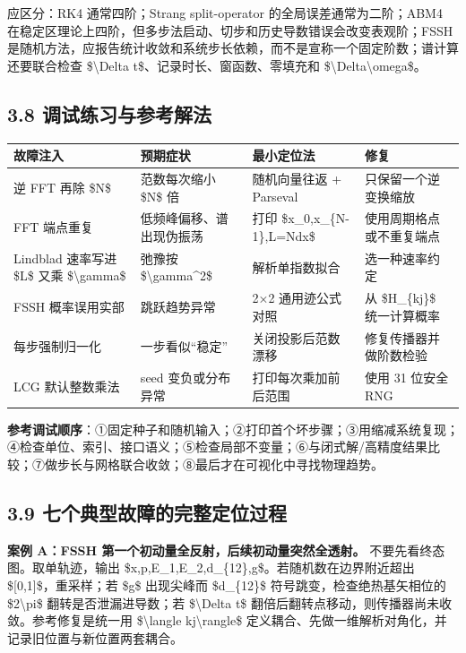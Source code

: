 \documentclass[UTF8,openany,11pt,fontset=fandol]{ctexbook}
\begin{document}
应区分：RK4 通常四阶；Strang split-operator 的全局误差通常为二阶；ABM4
在稳定区理论上四阶，但多步法启动、切步和历史导数错误会改变表观阶；FSSH
是随机方法，应报告统计收敛和系统步长依赖，而不是宣称一个固定阶数；谱计算还要联合检查
\$\textbackslash Delta t\$、记录时长、窗函数、零填充和
\$\textbackslash Delta\textbackslash omega\$。

\subsection{\texorpdfstring{\textbf{3.8
调试练习与参考解法}}{3.8 调试练习与参考解法}}\label{ux8c03ux8bd5ux7ec3ux4e60ux4e0eux53c2ux8003ux89e3ux6cd5}

\begin{longtable}[]{@{}llll@{}}
\toprule
\textbf{故障注入} & \textbf{预期症状} & \textbf{最小定位法} &
\textbf{修复}\tabularnewline
\midrule
\endhead
逆 FFT 再除 \$N\$ & 范数每次缩小 \$N\$ 倍 & 随机向量往返 + Parseval &
只保留一个逆变换缩放\tabularnewline
FFT 端点重复 & 低频峰偏移、谱出现伪振荡 & 打印 \$x\_0,x\_\{N-1\},L=Ndx\$
& 使用周期格点或不重复端点\tabularnewline
Lindblad 速率写进 \$L\$ 又乘 \$\textbackslash gamma\$ & 弛豫按
\$\textbackslash gamma\^{}2\$ & 解析单指数拟合 &
选一种速率约定\tabularnewline
FSSH 概率误用实部 & 跳跃趋势异常 & 2×2 通用迹公式对照 & 从 \$H\_\{kj\}\$
统一计算概率\tabularnewline
每步强制归一化 & 一步看似``稳定'' & 关闭投影后范数漂移 &
修复传播器并做阶数检验\tabularnewline
LCG 默认整数乘法 & seed 变负或分布异常 & 打印每次乘加前后范围 & 使用 31
位安全 RNG\tabularnewline
\bottomrule
\end{longtable}

\textbf{参考调试顺序}：①固定种子和随机输入；②打印首个坏步骤；③用缩减系统复现；④检查单位、索引、接口语义；⑤检查局部不变量；⑥与闭式解/高精度结果比较；⑦做步长与网格联合收敛；⑧最后才在可视化中寻找物理趋势。

\subsection{\texorpdfstring{\textbf{3.9
七个典型故障的完整定位过程}}{3.9 七个典型故障的完整定位过程}}\label{ux4e03ux4e2aux5178ux578bux6545ux969cux7684ux5b8cux6574ux5b9aux4f4dux8fc7ux7a0b}

\textbf{案例 A：FSSH 第一个初动量全反射，后续初动量突然全透射。}
不要先看终态图。取单轨迹，输出
\$x,p,E\_1,E\_2,d\_\{12\},g\$。若随机数在边界附近超出
\${[}0,1{]}\$，重采样；若 \$g\$ 出现尖峰而 \$d\_\{12\}\$
符号跳变，检查绝热基矢相位的 \$2\textbackslash pi\$
翻转是否泄漏进导数；若 \$\textbackslash Delta t\$
翻倍后翻转点移动，则传播器尚未收敛。参考修复是统一用
\$\textbackslash langle k\textbar j\textbackslash rangle\$
定义耦合、先做一维解析对角化，并记录旧位置与新位置两套耦合。
\end{document}
